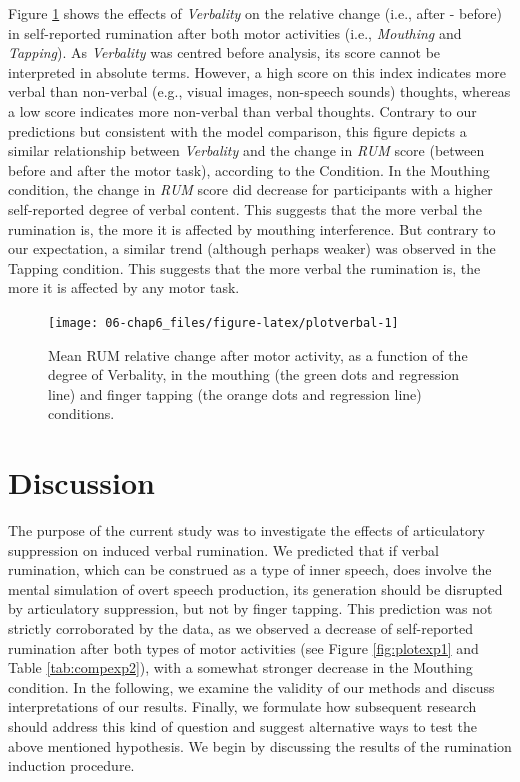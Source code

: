 \documentclass[a4paper,12pt,twoside,onecolumn,openright,final,oldfontcommands]{memoir}
\begin{document}
Figure \ref{fig:plotverbal} shows the effects of \emph{Verbality} on the relative change (i.e., after - before) in self-reported rumination after both motor activities (i.e., \emph{Mouthing} and \emph{Tapping}). As \emph{Verbality} was centred before analysis, its score cannot be interpreted in absolute terms. However, a high score on this index indicates more verbal than non-verbal (e.g., visual images, non-speech sounds) thoughts, whereas a low score indicates more non-verbal than verbal thoughts. Contrary to our predictions but consistent with the model comparison, this figure depicts a similar relationship between \emph{Verbality} and the change in \emph{RUM} score (between before and after the motor task), according to the Condition. In the Mouthing condition, the change in \emph{RUM} score did decrease for participants with a higher self-reported degree of verbal content. This suggests that the more verbal the rumination is, the more it is affected by mouthing interference. But contrary to our expectation, a similar trend (although perhaps weaker) was observed in the Tapping condition. This suggests that the more verbal the rumination is, the more it is affected by any motor task.

\begin{figure}[ht]

{\centering \texttt{[image: 06-chap6\_files/figure-latex/plotverbal-1]} 

}

\caption{Mean RUM relative change after motor activity, as a function of the degree of Verbality, in the mouthing (the green dots and regression line) and finger tapping (the orange dots and regression line) conditions.}\label{fig:plotverbal}
\end{figure}

\hypertarget{discussion-3}{%
\section{Discussion}\label{discussion-3}}

The purpose of the current study was to investigate the effects of articulatory suppression on induced verbal rumination. We predicted that if verbal rumination, which can be construed as a type of inner speech, does involve the mental simulation of overt speech production, its generation should be disrupted by articulatory suppression, but not by finger tapping. This prediction was not strictly corroborated by the data, as we observed a decrease of self-reported rumination after both types of motor activities (see Figure \ref{fig:plotexp1} and Table \ref{tab:compexp2}), with a somewhat stronger decrease in the Mouthing condition. In the following, we examine the validity of our methods and discuss interpretations of our results. Finally, we formulate how subsequent research should address this kind of question and suggest alternative ways to test the above mentioned hypothesis. We begin by discussing the results of the rumination induction procedure.
\end{document}
